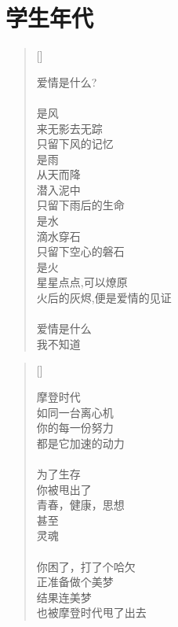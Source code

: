 \chapter{学生年代}
\thispagestyle{empty}
\renewcommand{\poemtoc}{section}
\settowidth{\versewidth}{只留下风的记忆}
\begin{verse}[\versewidth]

爱情是什么?\\
~\\
是风\\
\vin  来无影去无踪\\
\vin  只留下风的记忆\\
是雨\\
\vin  从天而降\\
\vin  潜入泥中\\
\vin  只留下雨后的生命\\
是水\\
\vin  滴水穿石\\
\vin  只留下空心的磐石\\
是火\\
\vin  星星点点,可以燎原\\
\vin  火后的灰烬,便是爱情的见证\\
~\\
爱情是什么\\
我不知道\\
\end{verse}
\newpage

\renewcommand{\poemtoc}{section}
\settowidth{\versewidth}{你的每一份努力}
\begin{verse}[\versewidth]

摩登时代\\
如同一台离心机\\
你的每一份努力\\
都是它加速的动力\\
~\\
为了生存\\
你被甩出了\\
\vin   青春，健康，思想\\
甚至\\
\vin   灵魂\\
~\\
你困了，打了个哈欠\\
正准备做个美梦\\
结果连美梦\\
也被摩登时代甩了出去
\end{verse}

